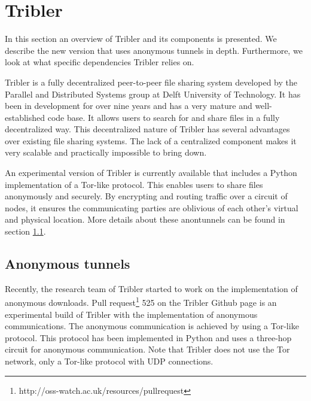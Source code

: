
\section{Tribler}
	\label{scc:tribler}
	In this section an overview of Tribler and its components is presented. We describe the new version that uses anonymous tunnels in depth. Furthermore, we look at what specific dependencies Tribler relies on.

	Tribler is a fully decentralized peer-to-peer file sharing system developed by the Parallel and Distributed Systems group at Delft University of Technology. It has been in development for over nine years and has a very mature and well-established code base. It allows users to search for and share files in a fully decentralized way. This decentralized nature of Tribler has several advantages over existing file sharing systems. The lack of a centralized component makes it very scalable and practically impossible to bring down.
		
	An experimental version of Tribler is currently available that includes a Python implementation of a Tor-like protocol. This enables users to share files anonymously and securely. By encrypting and routing traffic over a circuit of nodes, it ensures the communicating parties are oblivious of each other's virtual and physical location. More details about these anontunnels can be found in section \ref{sec:anonymoustunnels}.
	
	\subsection{Anonymous tunnels}
		\label{sec:anonymoustunnels}
			Recently, the research team of Tribler started to work on the implementation of anonymous downloads. Pull request\footnote{http://oss-watch.ac.uk/resources/pullrequest} 525 on the Tribler Github page \cite{pullrequest525} is an experimental build of Tribler with the implementation of anonymous communications. The anonymous communication is achieved by using a Tor-like protocol. This protocol has been implemented in Python and uses a three-hop circuit for anonymous communication. Note that Tribler does not use the Tor network, only a Tor-like protocol with UDP connections.
			
